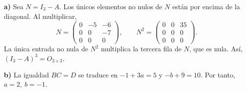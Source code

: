 \textbf{a)} Sea $N=I_3-A$. Los únicos elementos no nulos de $N$ están por encima de la diagonal. Al multiplicar,
\[
N=\begin{pmatrix}0&-5&-6\\0&0&-7\\0&0&0\end{pmatrix},
\qquad
N^2=\begin{pmatrix}0&0&35\\0&0&0\\0&0&0\end{pmatrix}.
\]
La única entrada no nula de $N^2$ multiplica la tercera fila de $N$, que es nula. Así, $(I_3-A)^3=O_{3\times3}$.

\textbf{b)} La igualdad $BC=D$ se traduce en $-1+3a=5$ y $-b+9=10$. Por tanto, $\boxed{a=2,\ b=-1}$.
